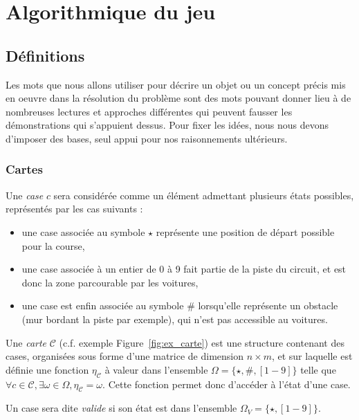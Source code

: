 \chapter{Algorithmique du jeu}

\section{Définitions}
Les mots que nous allons utiliser pour décrire un objet ou un concept précis mis en oeuvre dans la résolution du problème sont des mots pouvant donner lieu à de nombreuses lectures et approches différentes qui peuvent fausser les démonstrations qui s'appuient dessus. Pour fixer les idées, nous nous devons d'imposer des bases, seul appui pour nos raisonnements ultérieurs.

\subsection{Cartes}
\label{ssect:cartes}

Une \textit{case} $c$ sera considérée comme un élément admettant plusieurs états possibles, représentés par les cas suivants :
\begin{itemize}
\item une case associée au symbole $\star$ représente une position de départ possible pour la course,
\item une case associée à un entier de 0 à 9 fait partie de la piste du circuit, et est donc la zone parcourable par les voitures,
\item une case est enfin associée au symbole $\#$ lorsqu'elle représente un obstacle (mur bordant la piste par exemple), qui n'est pas accessible au voitures.
\end{itemize}

Une \textit{carte} $\mathcal{C}$ (c.f. exemple Figure~\vref{fig:ex_carte}) est une structure contenant des cases, organisées sous forme d'une matrice de dimension $n\times m$, et sur laquelle est définie une fonction $\eta_\mathcal{C}$ à valeur dans l'ensemble $\Omega = \{\star, \#, [1-9]\}$ telle que $\forall c\in \mathcal{C}, \exists \omega\in \Omega, \eta_\mathcal{C} = \omega$. Cette fonction permet donc d'accéder à l'état d'une case.

Un case sera dite \textit{valide} si son état est dans l'ensemble $\Omega_V = \{\star, [1-9]\}$.

